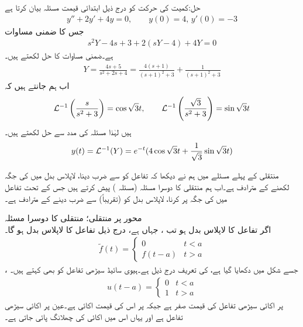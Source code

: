 حل:کمیت کی حرکت کو درج ذیل ابتدائی قیمت مسئلہ بیان کرتا ہے
\begin{align*}
y''+2y'+4y=0,\quad \quad y(0)=4, \, y'(0)=-3
\end{align*}
جس کا ضمنی مساوات 
\begin{align*}
s^2Y-4s+3+2(sY-4)+4Y=0
\end{align*}
ہے۔ضمنی مساوات کا حل لکھتے ہیں۔
\begin{align*}
Y=\frac{4s+5}{s^2+2s+4}=\frac{4(s+1)}{(s+1)^2+3}+\frac{1}{(s+1)^2+3}
\end{align*}
اب ہم جانتے ہیں کہ
\begin{align*}
\mathcal{L}^{-1}\left(\frac{s}{s^2+3}\right)=\cos \sqrt{3}t, \quad \quad \mathcal{L}^{-1}\left(\frac{\sqrt{3}}{s^2+3}\right)=\sin \sqrt{3}t
\end{align*}
ہیں لہٰذا مسئلہ  کی مدد سے حل لکھتے ہیں۔
\begin{align*}
y(t)=\mathcal{L}^{-1}(Y)=e^{-t}(4\cos \sqrt{3}t+\frac{1}{\sqrt{3}}\sin \sqrt{3}t)
\end{align*}

منتقلی کے پہلے مسئلے میں ہم نے دیکھا کہ تفاعل  کو  سے ضرب دینا، لاپلاس بدل میں  کی جگہ  لکھنے کے مترادف ہے۔اب ہم منتقلی کا دوسرا مسئلہ (مسئلہ ) پیش کرتے ہیں جس کے تحت تفاعل  میں  کی جگہ  پر کرنا، لاپلاس بدل  کو (تقریباً)  سے ضرب دینے کے مترادف ہے۔

\quad {} محور پر منتقلی؛ منتقلی کا دوسرا مسئلہ\\
اگر تفاعل  کا لاپلاس بدل  ہو تب ، جہاں  ہے، درج ذیل تفاعل کا لاپلاس بدل ہو گا۔
\begin{align*}
\tilde{f}(t)=
\begin{cases}
0& t<a\\
f(t-a) &  t>a
\end{cases}
\end{align*}
، جسے شکل  میں دکھایا گیا ہے، کی تعریف درج ذیل ہے۔ہیوی سائیڈ سیڑھی تفاعل کو  بھی  کہتے ہیں۔
\begin{align}
u(t-a)=
\begin{cases}
0 & t<a\\
1& t>a
\end{cases}
\end{align}
 پر اکائی سیڑھی تفاعل کی قیمت صفر ہے جبکہ  پر اس کی قیمت اکائی ہے۔عین  پر اکائی سیڑھی تفاعل  ہے اور یہاں اس میں اکائی کی چھلانگ پائی جاتی ہے۔

